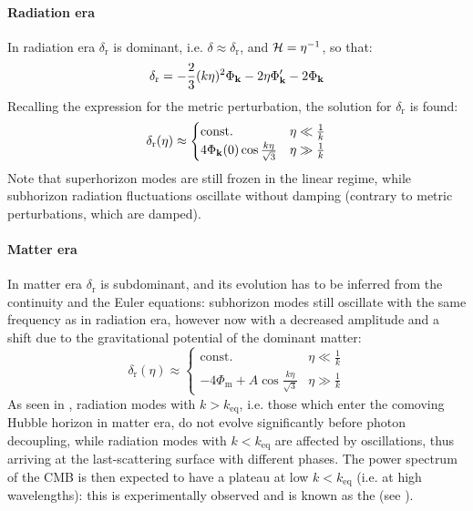 \paragraph{Radiation era}

In radiation era $ \delta_\text{r} $ is dominant, i.e. $ \delta \approx \delta_\text{r} $, and $ \mathcal{H} = \eta^{-1} $, so that:
\begin{equation*}
  \delta_\text{r} = - \frac{2}{3} (k\eta)^2 \Phi_{\mathbf{k}} - 2 \eta \Phi_{\mathbf{k}}' - 2 \Phi_{\mathbf{k}}
\end{equation*}
Recalling the expression  for the metric perturbation, the solution for $ \delta_\text{r} $ is found:
\begin{equation}
  \delta_\text{r}(\eta) \approx
  \begin{cases}
    \text{const.} & \eta \ll \frac{1}{k} \\
    4 \Phi_{\mathbf{k}}(0) \cos \frac{k \eta}{\sqrt{3}} & \eta \gg \frac{1}{k}
  \end{cases}
\end{equation}
Note that superhorizon modes are still frozen in the linear regime, while subhorizon radiation fluctuations oscillate without damping (contrary to metric perturbations, which are damped).

\paragraph{Matter era}

In matter era $ \delta_\text{r} $ is subdominant, and its evolution has to be inferred from the continuity and the Euler equations: subhorizon modes still oscillate with the same frequency as in radiation era, however now with a decreased amplitude and a shift due to the gravitational potential of the dominant matter:
\begin{equation}
  \delta_\text{r}(\eta) \approx
  \begin{cases}
    \text{const.} & \eta \ll \frac{1}{k} \\
    -4 \Phi_\text{m} + A \cos \frac{k \eta}{\sqrt{3}} & \eta \gg \frac{1}{k}
  \end{cases}
\end{equation}
As seen in , radiation modes with $ k > k_\text{eq} $, i.e. those which enter the comoving Hubble horizon in matter era, do not evolve significantly before photon decoupling, while radiation modes with $ k < k_\text{eq} $ are affected by oscillations, thus arriving at the last-scattering surface with different phases. The power spectrum of the CMB is then expected to have a plateau at low $ k < k_\text{eq} $ (i.e. at high wavelengths): this is experimentally observed and is known as the  (see ).

